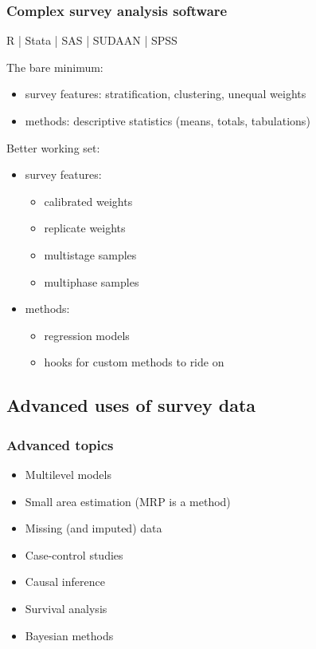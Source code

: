 \documentclass{beamer}
\begin{document}
\begin{frame}\frametitle{Complex survey analysis software}

R | Stata | SAS | SUDAAN | SPSS

\bigskip

The bare minimum:
\begin{itemize}
    \item survey features: stratification, clustering, unequal weights
    \item methods: descriptive statistics (means, totals, tabulations)
\end{itemize}

Better working set:
\begin{itemize}
    \item survey features:
    \begin{itemize}
        \item calibrated weights
        \item replicate weights
        \item multistage samples
        \item multiphase samples
    \end{itemize}
    \item methods:
    \begin{itemize}
        \item regression models
        \item hooks for custom methods to ride on
    \end{itemize}
\end{itemize}

\end{frame}



\subsection{Advanced uses of survey data}

\begin{frame}\frametitle{Advanced topics}

\begin{itemize}
    \item Multilevel models
    \item Small area estimation (MRP is a method)
    \item Missing (and imputed) data
    \item Case-control studies
    \item Causal inference
    \item Survival analysis
    \item Bayesian methods
\end{itemize}

\end{frame}
\end{document}
